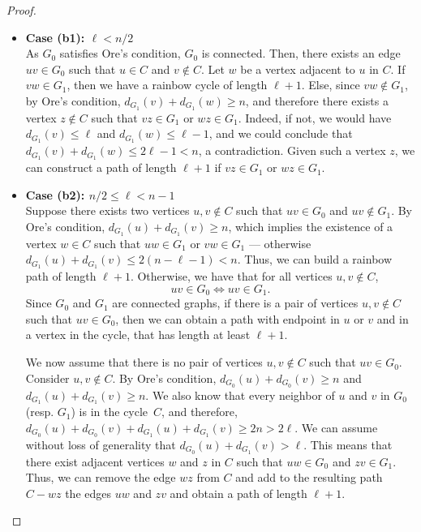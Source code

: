 \begin{proof}
\smallskip

\begin{itemize}
  
\item[]\textbf{Case (b1): \(\ell < n/2 \)} \\

As \(G_0\) satisfies Ore's condition, \(G_0\) is connected.  Then,
there exists an edge \( uv \in G_0 \) such that \( u \in C \)
and \( v \not\in C \).  Let \(w\) be a vertex adjacent to \(u\) in
\(C\).  If \(vw \in G_1\), then we have a rainbow cycle of
length \(\ell+1\).  Else, since \( vw \not\in G_1 \), by Ore's
condition, \( d_{G_1}(v) + d_{G_1}(w) \geq n \), and therefore there exists 
a vertex \( z  \not\in C\) such that \(vz \in G_1 \) or
\( wz \in G_1 \). Indeed, if not, we would have \( d_{G_1}(v) \leq \ell \)
and \( d_{G_1}(w) \leq \ell - 1 \), and we could conclude that 
\( d_{G_1}(v) + d_{G_1}(w) \leq 2\ell - 1 < n \), a contradiction.
%
Given such a vertex \(z\), we can construct a path of length \(\ell+1 \) if
\( vz \in G_1 \) or \( wz \in G_1 \). \\ 

  
\item[]\textbf{Case (b2): \(n/2 \leq  \ell < n-1 \)}\\

Suppose there exists two vertices \( u, v \not\in C \) such that
\( uv \in G_0 \) and \( uv \not\in G_1 \).  By Ore's
condition, \( d_{G_1}(u) + d_{G_1}(v) \geq n \), which implies the
existence of a vertex \( w \in C \) such that \( uw \in G_1 \) or
\( vw \in G_1 \) --- otherwise
\( d_{G_1}(u) + d_{G_1}(v) \leq 2 (n - \ell - 1) < n \). Thus, we can
build a rainbow path of length \( \ell+1 \).  Otherwise, we have that for
all vertices \( u, v \not\in C \), 
\[ uv \in G_0 \Longleftrightarrow uv \in G_1. \]
Since \(G_0\) and \(G_1\) are connected graphs, if there is a pair of vertices 
\(u, v \not\in C\) such that \( uv \in G_0 \), then we can obtain a 
path with endpoint in \(u\) or \(v\) and in a vertex in the cycle,
that has  length at least \( \ell + 1 \).

We now assume that there is no pair of vertices \(u, v \not \in C\)
such that \( uv \in G_0 \).  Consider \( u, v \not\in C \). By Ore's
condition, \( d_{G_0}(u) + d_{G_0}(v) \geq n \) and
\( d_{G_1}(u) + d_{G_1}(v) \geq n \).  We also know that every
neighbor of \(u\) and \(v\) in \(G_0\) (resp. \(G_1\)) is in the
cycle~$C$, and therefore,
\( d_{G_0}(u) + d_{G_0}(v) + d_{G_1}(u) + d_{G_1}(v) \geq 2n > 2\ell \).
We can assume without loss of generality that
\( d_{G_0}(u) + d_{G_1}(v) > \ell \).  This means that there exist
adjacent vertices \(w\) and \(z\) in \(C\) such that \( uw \in G_0 \)
and \( zv \in G_1 \).  Thus, we can remove the edge $wz$ from $C$ and
add to the resulting path $C-wz$ the edges $uw$ and $zv$ and obtain a
path of length \(\ell+1\).

\end{itemize}

\end{proof}



